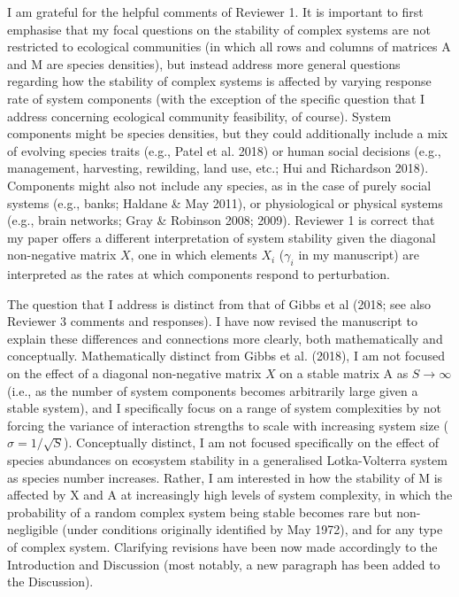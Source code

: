 \documentclass[]{article}
\begin{document}
I am grateful for the helpful comments of Reviewer 1. It is important to
first emphasise that my focal questions on the stability of complex
systems are not restricted to ecological communities (in which all rows
and columns of matrices A and M are species densities), but instead
address more general questions regarding how the stability of complex
systems is affected by varying response rate of system components (with
the exception of the specific question that I address concerning
ecological community feasibility, of course). System components might be
species densities, but they could additionally include a mix of evolving
species traits (e.g., Patel et al. 2018) or human social decisions
(e.g., management, harvesting, rewilding, land use, etc.; Hui and
Richardson 2018). Components might also not include any species, as in
the case of purely social systems (e.g., banks; Haldane \& May 2011), or
physiological or physical systems (e.g., brain networks; Gray \&
Robinson 2008; 2009). Reviewer 1 is correct that my paper offers a
different interpretation of system stability given the diagonal
non-negative matrix \(X\), one in which elements \(X_{i}\)
(\(\gamma_{i}\) in my manuscript) are interpreted as the rates at which
components respond to perturbation.

The question that I address is distinct from that of Gibbs et al (2018;
see also Reviewer 3 comments and responses). I have now revised the
manuscript to explain these differences and connections more clearly,
both mathematically and conceptually. Mathematically distinct from Gibbs
et al. (2018), I am not focused on the effect of a diagonal non-negative
matrix \(X\) on a stable matrix A as \(S \to \infty\) (i.e., as the
number of system components becomes arbitrarily large given a stable
system), and I specifically focus on a range of system complexities by
not forcing the variance of interaction strengths to scale with
increasing system size (\(\sigma = 1/\sqrt{S}\)). Conceptually distinct,
I am not focused specifically on the effect of species abundances on
ecosystem stability in a generalised Lotka-Volterra system as species
number increases. Rather, I am interested in how the stability of M is
affected by X and A at increasingly high levels of system complexity, in
which the probability of a random complex system being stable becomes
rare but non-negligible (under conditions originally identified by May
1972), and for any type of complex system. Clarifying revisions have
been now made accordingly to the Introduction and Discussion (most
notably, a new paragraph has been added to the Discussion).
\end{document}
